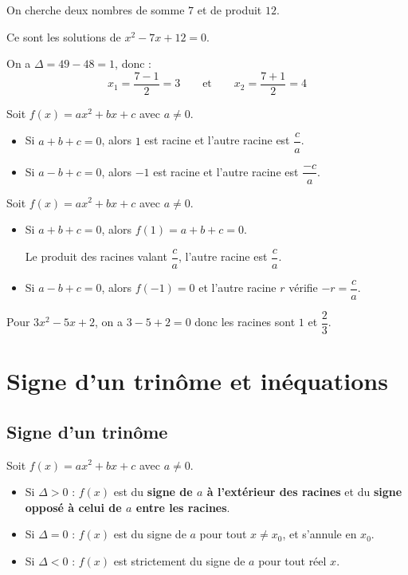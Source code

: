 \begin{ex}
	On cherche deux nombres de somme $7$ et de produit $12$.

	Ce sont les solutions de $x^2 - 7x + 12 = 0$.

	On a $\Delta = 49 - 48 = 1$, donc :
	\[
		x_1 = \dfrac{7 - 1}{2} = 3\qquad\text{et}\qquad x_2 = \dfrac{7 + 1}{2} = 4
	\]

\end{ex}

\begin{prop}
	Soit $f(x) = ax^2 + bx + c$ avec $a \neq 0$.
	\begin{itemize}
		\item Si $a + b + c = 0$, alors $1$ est racine et l'autre racine est $\dfrac{c}{a}$.
		\item Si $a - b + c = 0$, alors $-1$ est racine et l'autre racine est $\dfrac{-c}{a}$.
	\end{itemize}
\end{prop}

\begin{demo}
	Soit $f(x) = ax^2 + bx + c$ avec $a \neq 0$.
	\begin{itemize}
		\item Si $a + b + c = 0$, alors $f(1) = a+b+c = 0$.

		      Le produit des racines valant $\dfrac{c}{a}$, l'autre racine est $\dfrac{c}{a}$.

		\item Si $a - b + c = 0$, alors $f(-1) = 0$ et l'autre racine $r$ vérifie $-r = \dfrac{c}{a}$.
	\end{itemize}
\end{demo}

\begin{ex}
	Pour $3x^2 - 5x + 2$, on a $3 - 5 + 2 = 0$ donc les racines sont $1$ et $\dfrac{2}{3}$.
\end{ex}

\section{Signe d'un trinôme et inéquations}

\subsection{Signe d'un trinôme}

\begin{thm}
	Soit $f(x) = ax^2 + bx + c$ avec $a \neq 0$.
	\begin{itemize}
		\item Si $\Delta > 0$ : $f(x)$ est du \textbf{signe de $a$ à l'extérieur des racines} et du \textbf{signe opposé à celui de $a$ entre les racines}.
		\item Si $\Delta = 0$ : $f(x)$ est du signe de $a$ pour tout $x \neq x_0$, et s'annule en $x_0$.
		\item Si $\Delta < 0$ : $f(x)$ est strictement du signe de $a$ pour tout réel $x$.
	\end{itemize}
\end{thm}

